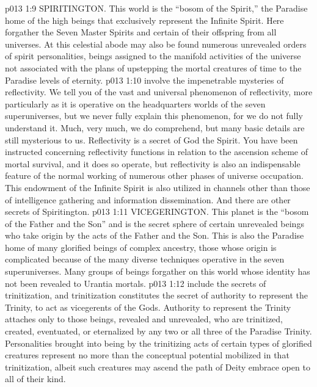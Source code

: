 \vs p013 1:9 \bibnobreakspace SPIRITINGTON. This world is the “bosom of the Spirit,” the Paradise home of the high beings that exclusively represent the Infinite Spirit. Here forgather the Seven Master Spirits and certain of their offspring from all universes. At this celestial abode may also be found numerous unrevealed orders of spirit personalities, beings assigned to the manifold activities of the universe not associated with the plans of upstepping the mortal creatures of time to the Paradise levels of eternity.
\vs p013 1:10 \pc {} involve the impenetrable mysteries of reflectivity. We tell you of the vast and universal phenomenon of reflectivity, more particularly as it is operative on the headquarters worlds of the seven superuniverses, but we never fully explain this phenomenon, for we do not fully understand it. Much, very much, we do comprehend, but many basic details are still mysterious to us. Reflectivity is a secret of God the Spirit. You have been instructed concerning reflectivity functions in relation to the ascension scheme of mortal survival, and it does so operate, but reflectivity is also an indispensable feature of the normal working of numerous other phases of universe occupation. This endowment of the Infinite Spirit is also utilized in channels other than those of intelligence gathering and information dissemination. And there are other secrets of Spiritington.
\vs p013 1:11 \bibnobreakspace VICEGERINGTON. This planet is the “bosom of the Father and the Son” and is the secret sphere of certain unrevealed beings who take origin by the acts of the Father and the Son. This is also the Paradise home of many glorified beings of complex ancestry, those whose origin is complicated because of the many diverse techniques operative in the seven superuniverses. Many groups of beings forgather on this world whose identity has not been revealed to Urantia mortals.
\vs p013 1:12 \pc {} include the secrets of trinitization, and trinitization constitutes the secret of authority to represent the Trinity, to act as vicegerents of the Gods. Authority to represent the Trinity attaches only to those beings, revealed and unrevealed, who are trinitized, created, eventuated, or eternalized by any two or all three of the Paradise Trinity. Personalities brought into being by the trinitizing acts of certain types of glorified creatures represent no more than the conceptual potential mobilized in that trinitization, albeit such creatures may ascend the path of Deity embrace open to all of their kind.
